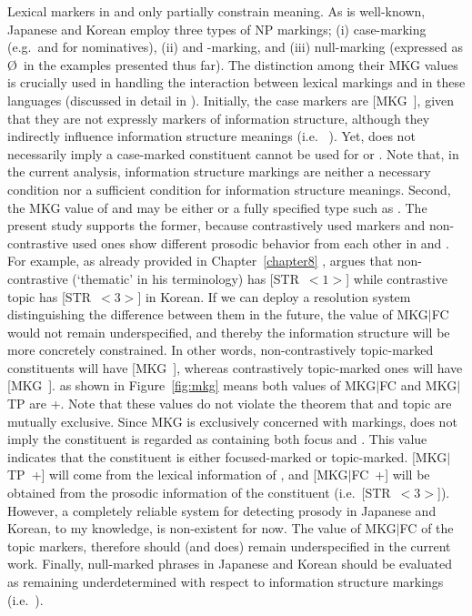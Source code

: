 Lexical markers in  and  only partially
constrain meaning. As is well-known, Japanese and Korean employ three
types of NP markings; (i) case-marking (e.g.\ \ga and \ika for
nominatives), (ii) \wa and \nun-marking, and (iii) null-marking
(expressed as {\O}~in the examples presented thus far). The distinction among their MKG values is crucially used in
handling the interaction between lexical markings and 
in these languages (discussed in detail in
 ).  Initially, the
case markers are \mbox{[MKG ]}, given that they are
not expressly markers of information structure, although they
indirectly influence information structure meanings
(i.e.\  \citep{heycock:94}). Yet,  does not
necessarily imply a case-marked constituent cannot be used for 
or . Note that, in the current analysis, information structure
markings are neither a necessary condition nor a sufficient condition
for information structure meanings.  Second, the MKG value of \wa and
\nun may be either  or a fully specified type such as
. The present study supports the former, because
contrastively used markers and non-contrastive used ones show
different prosodic behavior from each other in  and
 \citep{chang:02,nakanishi:07}.  For example, as already
provided in Chapter~\ref{chapter8} ,
\citet{chang:02} argues that non-contrastive (`thematic' in his
terminology)  has \mbox{[STR \ensuremath{<1>}]} while contrastive
topic has \mbox{[STR \ensuremath{<3>}]} in Korean.
If we can deploy a
resolution system distinguishing the difference between them in the
future, the value of \mbox{MKG{$\mid$}FC} would not remain
underspecified, and thereby the information structure will be more
concretely constrained. In other words, non-contrastively
topic-marked constituents will have \mbox{[MKG ]},
whereas contrastively topic-marked ones will have \mbox{[MKG
    ]}.  as shown in Figure~\ref{fig:mkg}
means both values of MKG{$\mid$}FC and MKG{$\mid$}TP are +. Note that
these values do not violate the theorem that  and topic are
mutually exclusive.  Since MKG is exclusively concerned with markings,
 does not imply the constituent is regarded as containing
both focus and .  This value indicates that the constituent is
either focused-marked or topic-marked.  \mbox{[MKG{$\mid$}TP +]} will
come from the lexical information of \nun, and \mbox{[MKG{$\mid$}FC
    +]} will be obtained from the prosodic information of the
constituent (i.e.\ \mbox{[STR \ensuremath{<3>}]}).
However, a completely reliable system for detecting prosody in
Japanese and Korean, to my knowledge, is non-existent for now.  The
value of MKG{$\mid$}FC of the topic markers, therefore should (and
does) remain underspecified in the current work.  Finally, null-marked
phrases in Japanese and Korean should be evaluated as remaining
underdetermined with respect to information structure markings
(i.e.\ ).




